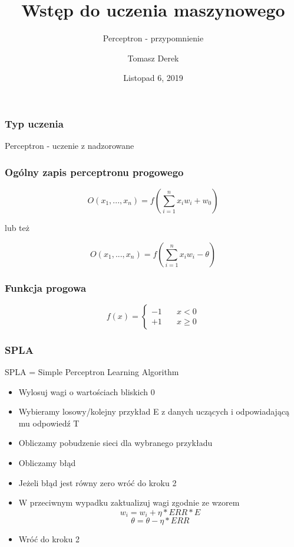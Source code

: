 \documentclass[16pt]{beamer}
\title{Wstęp do uczenia maszynowego}
\subtitle{Perceptron - przypomnienie}
\author{Tomasz Derek}
\institute{KMS}
\date{Listopad 6, 2019}
\begin{document}
 
\frame{\titlepage}
 
\begin{frame}
\frametitle{Typ uczenia}
\begin{center}
Perceptron - uczenie z nadzorowane
\end{center}
\end{frame} 
 
\begin{frame}
\frametitle{Ogólny zapis perceptronu progowego}
\[
    O(x_1, ..., x_n) = f(\sum_{i=1}^{n}x_iw_i + w_0)
\]
\begin{center}
    lub też
\end{center}
\[
    O(x_1, ..., x_n) = f(\sum_{i=1}^{n}x_iw_i - \theta)
\]
\end{frame} 
 
\begin{frame}
\frametitle{Funkcja progowa}
\[ f(x) =
  \begin{cases}
    -1       & \quad x < 0\\
    +1  & \quad x \geq 0
  \end{cases}
\]
\end{frame}

\begin{frame}
\frametitle{SPLA}
SPLA = Simple Perceptron Learning Algorithm
\begin{itemize}
  \item Wylosuj wagi o wartościach bliskich 0
  \item Wybieramy losowy/kolejny przykład E z danych uczących i odpowiadającą mu
odpowiedź T
  \item Obliczamy pobudzenie sieci dla wybranego przykładu
  \item Obliczamy błąd
  \item Jeżeli błąd jest równy zero wróć do kroku 2
  \item W przeciwnym wypadku zaktualizuj wagi zgodnie ze wzorem
  \[
  w_i = w_i + \eta * ERR * E
  \]
  \[
  \theta = \theta - \eta * ERR
  \]
  \item Wróć do kroku 2
\end{itemize}
\end{frame}
\end{document}
